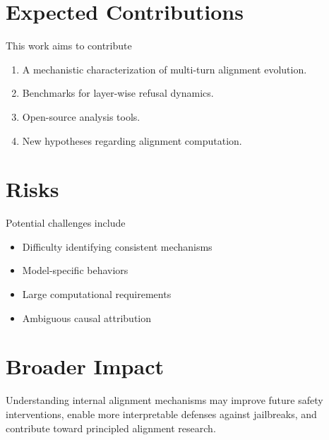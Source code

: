 \documentclass[11pt]{article}
\begin{document}
\section{Expected Contributions}

This work aims to contribute

\begin{enumerate}

\item A mechanistic characterization of multi-turn alignment evolution.

\item Benchmarks for layer-wise refusal dynamics.

\item Open-source analysis tools.

\item New hypotheses regarding alignment computation.

\end{enumerate}

\section{Risks}

Potential challenges include

\begin{itemize}

\item Difficulty identifying consistent mechanisms

\item Model-specific behaviors

\item Large computational requirements

\item Ambiguous causal attribution

\end{itemize}

\section{Broader Impact}

Understanding internal alignment mechanisms may improve future safety interventions, enable more interpretable defenses against jailbreaks, and contribute toward principled alignment research.



\end{document}
